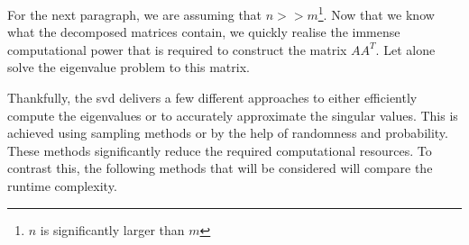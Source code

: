 For the next paragraph, we are assuming that $n>>m$\footnote{$n$ is significantly larger than $m$}.
Now that we know what the decomposed matrices contain, we quickly realise the immense computational power that is required to construct the matrix $AA^T$.
Let alone solve the eigenvalue problem to this matrix.

Thankfully, the \gls{svd} delivers a few different approaches to either efficiently compute the eigenvalues or to accurately approximate the \gls{singular} values.
This is achieved using sampling methods or by the help of randomness and probability.
These methods significantly reduce the required computational resources.
To contrast this, the following methods that will be considered will compare the runtime complexity.



\clearpage
